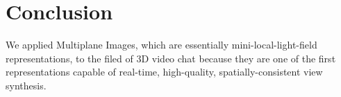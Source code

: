 \section{Conclusion}\label{sec:conclusion}

We applied Multiplane Images, which are essentially mini-local-light-field representations, to the filed of 3D video chat because they are one of the first representations capable of real-time, high-quality, spatially-consistent view synthesis.